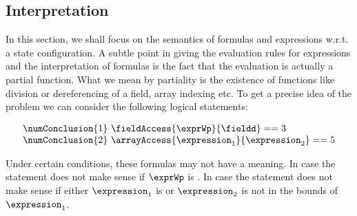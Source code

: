 
\newtheorem{interpretation}{Definition}[section]


\subsection{Interpretation}\label{interpret}
%
In this section, we shall focus on the semantics of formulas and expressions w.r.t. a state configuration.
A subtle point in giving the evaluation rules for expressions and the interpretation of formulas
is the fact that the evaluation is actually  a partial function.%
What we mean by partiality is the existence of functions like division or dereferencing of a field, array indexing etc. 
To get a precise idea of the problem we can consider the following logical statements: 

$$
\begin{array}{l} 
\numConclusion{1} \  \fieldAccess{\exprWp}{\fieldd} == 3\\
\numConclusion{2} \ \arrayAccess{\expression_1} {\expression_2} == 5
\end{array}
$$   

Under certain conditions, these formulas may not have a meaning. In case 
  the statement does not make sense if
$\exprWp$ is \Mynull. In case    the statement does not make sense if 
either $\expression_1 $ is \Mynull{} or $\expression_2$  is not in the bounds of $\expression_1 $.


